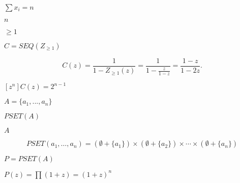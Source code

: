 \documentclass[10pt]{book}
\begin{document}
\begin{mdSnippets}
\begin{mdInlineSnippet}[4edcda6935374226723f6450855eb43b]%
$\sum x_i = n$\end{mdInlineSnippet}%
\begin{mdInlineSnippet}[7b8b965ad4bca0e41ab51de7b31363a1]%
$n$\end{mdInlineSnippet}%
\begin{mdInlineSnippet}[190e98cf0a6ba7a8b6ed2eafbfb4e8ea]%
$\geq 1$\end{mdInlineSnippet}%
\begin{mdInlineSnippet}%
$C=SEQ(Z_{\geq1})$\end{mdInlineSnippet}%
\begin{mdDisplaySnippet}[36219a14f7414d3c3884512d6012ec17]%
\[%
 C(z)=\frac{1}{1-Z_{\geq1}(z)}=\frac{1}{1-\frac{z}{1-z}}=\frac{1-z}{1-2z}.
\]%
\end{mdDisplaySnippet}%
\begin{mdInlineSnippet}[4bb8eae0518784707e4f9d6a8d60e295]%
$[z^n]C(z)=2^{n-1}$\end{mdInlineSnippet}%
\begin{mdInlineSnippet}[6ab6af6d3b29917fa077422bcdbe8917]%
$A=\{a_1,...,a_n\}$\end{mdInlineSnippet}%
\begin{mdInlineSnippet}%
$PSET(A)$\end{mdInlineSnippet}%
\begin{mdInlineSnippet}[7fc56270e7a70fa81a5935b72eacbe29]%
$A$\end{mdInlineSnippet}%
\begin{mdDisplaySnippet}%
\[%
PSET(a_1,\ldots,a_n) = (\emptyset+\{a_1\})\times(\emptyset+\{a_2\})\times\cdots\times(\emptyset + \{a_n\})
\]%
\end{mdDisplaySnippet}%
\begin{mdInlineSnippet}%
$P=PSET(A)$\end{mdInlineSnippet}%
\begin{mdInlineSnippet}[f5f7fbbfa195fd2927233b3c7907e8ab]%
$P(z)=\prod(1+z)=(1+z)^n$\end{mdInlineSnippet}%

\end{mdSnippets}
\end{document}
